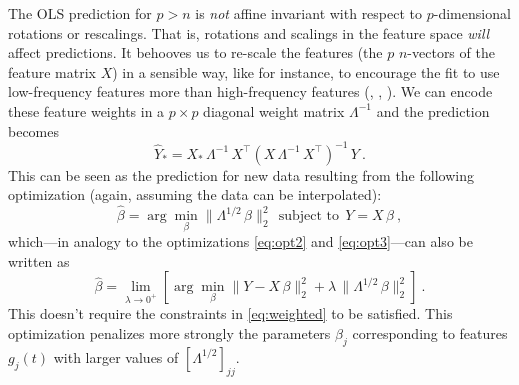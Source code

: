 \documentclass[12pt,letterpaper]{article}
\begin{document}
The OLS prediction for $p>n$ is \emph{not} affine invariant with respect to $p$-dimensional rotations or rescalings.
That is, rotations and scalings in the feature space \emph{will} affect predictions.
It behooves us to re-scale the features (the $p$ $n$-vectors of the feature matrix $X$) in a sensible way, like for instance, to encourage the fit to use low-frequency features more than high-frequency features (\citealt{xie2020weighted}, \citealt{bah2016sample}, \citealt{rauhut2016interpolation}).
We can encode these feature weights in a $p\times p$ diagonal weight matrix $\Lambda^{-1}$ and the prediction becomes
\begin{equation} \label{eq:weighted_sol}
    \hat{Y}_\ast = X_\ast\,\Lambda^{-1}\,X^\top (X\,\Lambda^{-1}\,X^\top)^{-1}\,Y
    ~.
\end{equation}
This can be seen as the prediction for new data resulting from the following optimization (again, assuming the data can be interpolated):
\begin{equation} \label{eq:weighted}
    \hat{\beta} = \arg\min_\beta \|\Lambda^{1/2}\,\beta\|_2^2 ~~\mbox{subject to}~~ Y = X\,\beta
    ~,
\end{equation}
which---in analogy to the optimizations \eqref{eq:opt2} and \eqref{eq:opt3}---can also be written as
\begin{equation}
    \hat{\beta} = \lim_{\lambda\to 0^+}\left[\arg\min_\beta \|Y - X\,\beta\|_2^2 + \lambda\,\|\Lambda^{1/2}\,\beta\|_2^2\right]
    ~.
\end{equation}
This doesn't require the constraints in \eqref{eq:weighted} to be satisfied. 
This optimization
penalizes more strongly the parameters $\beta_j$ corresponding to features $g_j(t)$ with larger values of $[\Lambda^{1/2}]_{jj}$.
\end{document}
